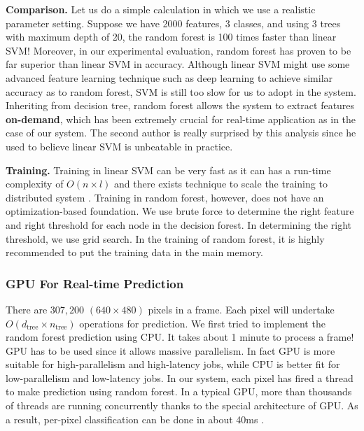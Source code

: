 
\textbf{Comparison.} Let us do a simple calculation in which we use a realistic parameter setting. Suppose we have 2000 features, 3 classes, and using 3 trees with maximum depth of 20, the random forest is 100 times faster than linear SVM! Moreover, in our experimental evaluation, random forest has proven to be far superior than linear SVM in accuracy. Although linear SVM might use some advanced feature learning technique such as deep learning to achieve similar accuracy as to random forest, SVM is still too slow for us to adopt in the system. Inheriting from decision tree, random forest allows the system to extract features \textbf{on-demand}, which has been extremely crucial for real-time application as in the case of our system. The second author  is really surprised by this analysis since he used to believe linear SVM is unbeatable in practice.  

\textbf{Training.} Training in linear SVM can be very fast as it can has a run-time complexity of $O(n\times l)$ and there exists technique to scale the training to distributed system . Training in random forest, however, does not have an optimization-based foundation. We use brute force to determine the right feature and right threshold for each node in the decision forest. In determining the right threshold, we use grid search. In the training of random forest, it is highly recommended to put the training data in the main memory. 


\subsubsection{GPU For Real-time Prediction} 
There are $307,200$ $(640\times 480)$ pixels in a frame. Each pixel will undertake $O(d_{\text{tree}}\times n_{\text{tree}})$ operations for prediction. We first tried to implement the random forest prediction using CPU. It takes about 1 minute to process a frame! GPU has to be used since it allows massive parallelism. In fact GPU is more suitable for high-parallelism and high-latency jobs, while CPU is better fit for low-parallelism and low-latency jobs. In our system, each pixel has fired a thread to make prediction using random forest. In a typical GPU, more than thousands of threads are running concurrently thanks to the special architecture of GPU. As a result, per-pixel classification can be done in about 40ms .    
